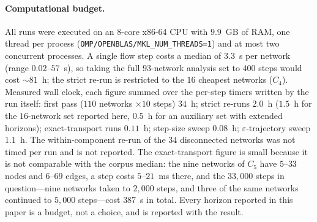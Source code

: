 \documentclass[11pt]{article}
\begin{document}
\paragraph{Computational budget.} All runs were executed on an 8-core
x86-64 CPU with $9.9$~GB of RAM, one thread per process
(\texttt{OMP/OPENBLAS/MKL\_NUM\_THREADS=1}) and at most two concurrent
processes. A single flow step costs a median of $3.3$~s per network (range
$0.02$--$57$~s), so taking the full $93$-network analysis set to $400$ steps
would cost $\sim81$~h; the strict re-run is restricted to the $16$ cheapest
networks ($C_4$). Measured wall clock, each figure summed over the per-step
timers written by the run itself: first pass ($110$ networks $\times10$ steps)
$34$~h; strict re-runs $2.0$~h ($1.5$~h for the $16$-network set reported here,
$0.5$~h for an auxiliary set with extended horizons); exact-transport runs
$0.11$~h; step-size sweep $0.08$~h; $\varepsilon$-trajectory sweep $1.1$~h.
The within-component re-run of the $34$ disconnected networks was not timed per
run and is not reported. The exact-transport figure is small because it is not
comparable with the corpus median: the nine networks of $C_5$ have $5$--$33$
nodes and $6$--$69$ edges, a step costs $5$--$21$~ms there, and the $33{,}000$
steps in question---nine networks taken to $2{,}000$ steps, and three of the
same networks continued to $5{,}000$ steps---cost $387$~s in total. Every
horizon reported in this paper is a budget, not a choice, and is reported with
the result.
\end{document}
